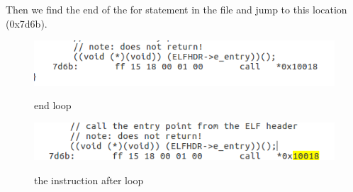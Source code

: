 Then we find the end of the for statement in the file and jump to this location (0x7d6b).
\begin{figure}[H]
  \centering
  \includegraphics[width=0.8\linewidth]{figure/end_for}\\
  \caption{end loop}\label{2}
\end{figure}
\begin{figure}[H]
  \centering
  \includegraphics[width=0.8\linewidth]{figure/7d6b}\\
  \caption{the instruction after loop}\label{2}
\end{figure}
\vspace{9pt}
